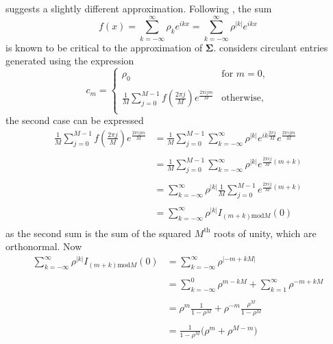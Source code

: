\documentclass[letterpaper,12pt,oneside,final]{article}
\newcommand{\sm}[1]{\boldsymbol{#1}}   %
\newcommand{\abs}[1]{\lvert{#1}\rvert}              %
\newcommand{\ind}[2]{I_{#2} \left( #1 \right)}
\begin{document}
\cite{gray2006toeplitz} suggests a slightly different approximation. Following \cite{grenanderszego1958}, the sum
$$f(x) = \sum_{k = -\infty}^{\infty} \rho_k e^{ikx} = \sum_{k = -\infty}^{\infty} \rho^{\abs{k}} e^{ikx}$$
is known to be critical to the approximation of $\sm{\Sigma}$. \cite{gray2006toeplitz} considers circulant entries generated using the expression
\begin{equation} \label{eq:multipleTesting:grayEq}
  c_m = \begin{cases}
    \rho_0 & \text{for } m = 0, \\
    & \\
    \frac{1}{M} \sum_{j = 0}^{M-1} f\left ( \frac{2\pi j}{M} \right ) e^{\frac{2 \pi i j m}{M}} & \text{otherwise}, \\
  \end{cases}
\end{equation}
the second case can be expressed
\begin{equation*}
  \begin{aligned}
    \frac{1}{M} \sum_{j = 0}^{M-1} f\left ( \frac{2\pi j}{M} \right ) e^{\frac{2 \pi i j m}{M}} & = \frac{1}{M} \sum_{j = 0}^{M-1} \sum_{k = -\infty}^{\infty} \rho^{\abs{k}} e^{ik \frac{2\pi j}{M}} e^{\frac{2 \pi i j m}{M}} \\
    & \\
    & = \frac{1}{M} \sum_{j = 0}^{M-1} \sum_{k = -\infty}^{\infty} \rho^{\abs{k}} e^{\frac{2 \pi i j}{M}(m+k)} \\
    & \\
    & = \sum_{k = -\infty}^{\infty} \rho^{\abs{k}} \frac{1}{M} \sum_{j = 0}^{M-1} e^{\frac{2 \pi i j}{M}(m+k)} \\
    & \\
    & = \sum_{k = -\infty}^{\infty} \rho^{\abs{k}} \ind{0}{(m+k)\text{mod} M} \\
  \end{aligned}
\end{equation*}
as the second sum is the sum of the squared $M^{\text{th}}$ roots of unity, which are orthonormal. Now
\begin{equation*}
  \begin{aligned}
    \sum_{k = -\infty}^{\infty} \rho^{\abs{k}} \ind{0}{(m+k)\text{mod} M} & = \sum_{k = -\infty}^{\infty} \rho^{\abs{-m + kM}} \\
    & \\
    & = \sum_{k = -\infty}^0 \rho^{m - kM} + \sum_{k = 1}^{\infty} \rho^{- m + kM} \\
    & \\
    & = \rho^m \frac{1}{1 - \rho^M} + \rho^{-m} \frac{\rho^M}{1 - \rho^M} \\
    & \\
    & = \frac{1}{1 - \rho^M} \big ( \rho^m + \rho^{M-m} \big ) \\
  \end{aligned}
\end{equation*}
\end{document}
